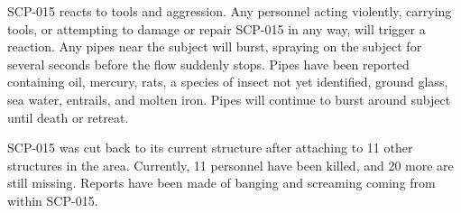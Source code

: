 SCP-015 reacts to tools and aggression. Any personnel acting violently, carrying tools, or attempting to damage or repair SCP-015 in any way, will trigger a reaction. Any pipes near the subject will burst, spraying on the subject for several seconds before the flow suddenly stops. Pipes have been reported containing oil, mercury, rats, a species of insect not yet identified, ground glass, sea water, entrails, and molten iron. Pipes will continue to burst around subject until death or retreat.

SCP-015 was cut back to its current structure after attaching to 11 other structures in the area. Currently, 11 personnel have been killed, and 20 more are still missing. Reports have been made of banging and screaming coming from within SCP-015.